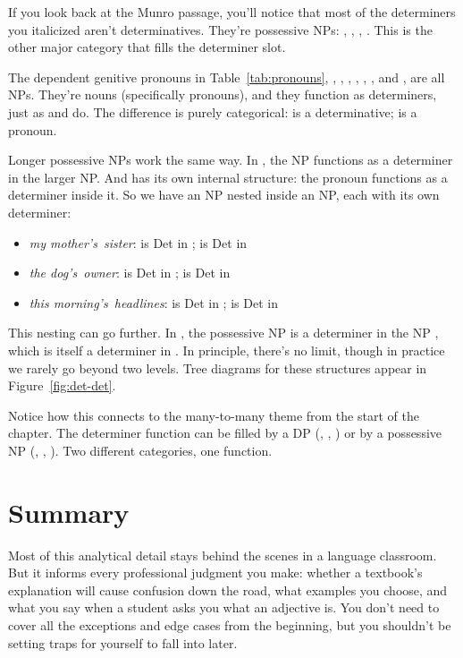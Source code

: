 If you look back at the Munro passage, you'll notice that most of the determiners you italicized aren't determinatives. They're possessive NPs: , , , . This is the other major category that fills the determiner slot.

The dependent genitive pronouns in Table~\ref{tab:pronouns}, , , , , , , and , are all NPs. They're nouns (specifically pronouns), and they function as determiners, just as  and  do. The difference is purely categorical:  is a determinative;  is a pronoun.

Longer possessive NPs work the same way. In , the NP  functions as a determiner in the larger NP. And  has its own internal structure: the pronoun  functions as a determiner inside it. So we have an NP nested inside an NP, each with its own determiner:

\begin{itemize}[noitemsep]
    \item \textit{\ob\emph{my} mother's\cb~sister}:  is Det in ;  is Det in 
    \item \textit{\ob\emph{the} dog's\cb~owner}:  is Det in ;  is Det in 
    \item \textit{\ob\emph{this} morning's\cb~headlines}:  is Det in ;  is Det in 
\end{itemize}

This nesting can go further. In , the possessive NP  is a determiner in the NP , which is itself a determiner in . In principle, there's no limit, though in practice we rarely go beyond two levels. Tree diagrams for these structures appear in Figure~\ref{fig:det-det}.

Notice how this connects to the many-to-many theme from the start of the chapter. The determiner function can be filled by a DP (, , ) or by a possessive NP (, , ). Two different categories, one function.

\section{Summary}

Most of this analytical detail stays behind the scenes in a language classroom. But it informs every professional judgment you make: whether a textbook's explanation will cause confusion down the road, what examples you choose, and what you say when a student asks you what an adjective is. You don't need to cover all the exceptions and edge cases from the beginning, but you shouldn't be setting traps for yourself to fall into later.

